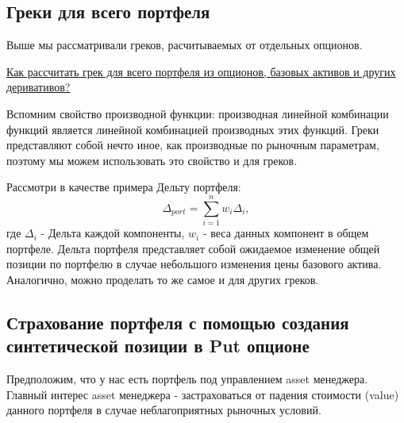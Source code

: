 \documentclass{article}
\begin{document}
\subsection{Греки для всего портфеля}

Выше мы рассматривали греков, расчитываемых от отдельных опционов.

\underline{Как рассчитать грек для всего портфеля из опционов, базовых активов и других деривативов?}

Вспомним свойство производной функции: производная линейной комбинации функций является линейной комбинацией производных этих функций. Греки представляют собой нечто иное, как производные по рыночным параметрам, поэтому мы можем использовать это свойство и для греков.

Рассмотри в качестве примера Дельту портфеля:
 $$\Delta_{port} = \sum_{i=1}^{n}w_i\Delta_i,$$
 где $\Delta_i$ - Дельта каждой компоненты, $w_i$ - веса данных компонент в общем портфеле.
 Дельта портфеля представляет собой ожидаемое изменение общей позиции по портфелю в случае небольшого изменения цены базового актива.
Аналогично, можно проделать то же самое и для других греков.

\subsection{Страхование портфеля с помощью создания синтетической позиции в Put опционе}

Предположим, что у нас есть портфель под управлением asset менеджера. Главный интерес asset менеджера - застраховаться от падения стоимости (value) данного портфеля в случае неблагоприятных рыночных условий.
\end{document}
